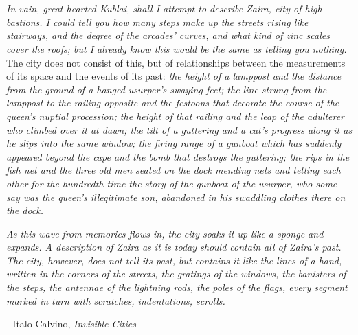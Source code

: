 \section{}

\textit{In vain, great-hearted Kublai, shall I attempt to describe Zaira, city
of high bastions. I could tell you how many steps make up the streets rising
like stairways, and the degree of the arcades' curves, and what kind of zinc
scales cover the roofs; but I already know this would be the same as telling
you nothing.} The city does not consist of this, but of relationships between
the measurements of its space and the events of its past: \textit{the height of
a lamppost and the distance from the ground of a hanged usurper's swaying feet;
the line strung from the lamppost to the railing opposite and the festoons that
decorate the course of the queen's nuptial procession; the height of that
railing and the leap of the adulterer who climbed over it at dawn; the tilt of
a guttering and a cat's progress along it as he slips into the same window; the
firing range of a gunboat which has suddenly appeared beyond the cape and the
bomb that destroys the guttering; the rips in the fish net and the three old
men seated on the dock mending nets and telling each other for the hundredth
time the story of the gunboat of the usurper, who some say was the queen's
illegitimate son, abandoned in his swaddling clothes there on the dock.}

\textit{As this wave from memories flows in, the city soaks it up like a sponge
and expands. A description of Zaira as it is today should contain all of
Zaira's past. The city, however, does not tell its past, but contains it like
the lines of a hand, written in the corners of the streets, the gratings of the
windows, the banisters of the steps, the antennae of the lightning rods, the
poles of the flags, every segment marked in turn with scratches, indentations,
scrolls. }

- Italo Calvino, \emph{Invisible Cities}
